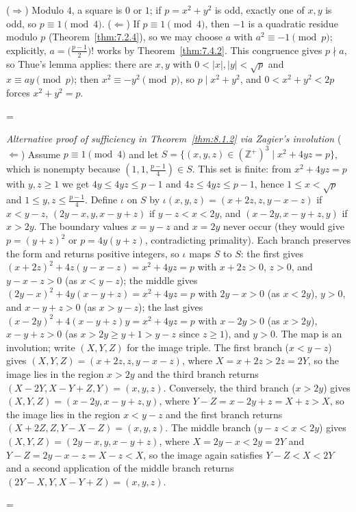 \documentclass[11pt]{article}
\makeatletter
\theoremstyle{ntstyle}
\let\nt@closedisplay\]
\def\nt@guardedclose{\@ifnextchar\par{\nt@closeafterpar}{\@ifnextchar\end{\postdisplaypenalty\@M\nt@closedisplay}{\nt@closedisplay}}}
\def\nt@closeafterpar\par{\@ifnextchar\par{\nt@closeafterpar}{\@ifnextchar\end{\postdisplaypenalty\@M\nt@closedisplay\par}{\nt@closedisplay\par}}}
\renewenvironment{proof}[1][\proofname]{\par
  \pushQED{\qed}\normalfont\topsep\medskipamount\edef\nt@afterproof{\@endparpenalty=\the\@endparpenalty\relax}\@beginparpenalty\@M\@endparpenalty\@M\let\]\nt@guardedclose\trivlist\item[]\textit{#1\@addpunct{.}} \ignorespaces}{\ifvmode\addpenalty\@M\fi\popQED\nt@afterproof\endtrivlist\@endpefalse}
\newenvironment{altproof}[1][\proofname]{\begin{proof}[#1]\renewcommand{\qedsymbol}{}}{\end{proof}}
\makeatother
\begin{document}
\begin{proof} ($\Rightarrow$) Modulo $4$, a square is $0$
	or $1$; if $p = x^2 + y^2$ is odd, exactly one of $x, y$ is odd, so
	$p \equiv 1 \pmod{4}$. ($\Leftarrow$) If $p \equiv 1 \pmod{4}$, then
	$-1$ is a quadratic residue modulo $p$ (Theorem~\ref{thm:7.2.4}), so we may choose $a$ with $a^2
		\equiv -1 \pmod{p}$; explicitly, $a=\big(\tfrac{p-1}{2}\big)!$ works by
	Theorem~\ref{thm:7.4.2}. This congruence gives $p\nmid a$, so Thue's
	lemma applies: there are $x, y$ with $0 < |x|,
		|y| < \sqrt{p}$ and $x \equiv a y \pmod{p}$; then $x^2 \equiv -y^2
		\pmod{p}$, so $p \mid x^2 + y^2$, and $0 < x^2 + y^2 < 2p$ forces $x^2
		+ y^2 = p$.

\end{proof}
\begin{altproof}[Alternative proof of sufficiency in Theorem~\ref{thm:8.1.2} via Zagier's involution] ($\Leftarrow$) Assume $p \equiv 1
		\pmod{4}$ and let $S = \{(x, y, z) \in (\mathbb{Z}^+)^3 \mid x^2 + 4yz =
		p\}$, which is nonempty because $(1, 1, \tfrac{p-1}{4}) \in S$. This set is finite:
	from $x^2+4yz=p$ with $y,z\ge1$ we get $4y\le 4yz\le p-1$ and
	$4z\le 4yz\le p-1$, hence $1\le x<\sqrt{p}$ and $1\le y,z\le\tfrac{p-1}{4}$. Define
	$\iota$ on $S$
	by $\iota(x, y, z) = (x + 2z, z, y - x - z)$ if $x < y - z$, $(2y -
		x, y, x - y + z)$ if $y - z < x < 2y$, and $(x - 2y, x - y + z, y)$ if $x
		> 2y$. The boundary values $x = y - z$ and $x = 2y$ never occur (they
	would give $p = (y+z)^2$ or $p = 4y(y+z)$, contradicting primality).
	Each branch preserves the form and returns positive integers, so
	$\iota$ maps $S$ to $S$: the first gives
	$(x+2z)^2+4z(y-x-z)=x^2+4yz=p$ with $x+2z>0$, $z>0$, and $y-x-z>0$
	(as $x<y-z$); the middle gives $(2y-x)^2+4y(x-y+z)=x^2+4yz=p$ with
	$2y-x>0$ (as $x<2y$), $y>0$, and $x-y+z>0$ (as $x>y-z$); the last
	gives $(x-2y)^2+4(x-y+z)y=x^2+4yz=p$ with $x-2y>0$ (as $x>2y$),
	$x-y+z>0$ (as $x>2y\ge y+1>y-z$ since $z\ge1$), and $y>0$.
	  The map is an involution; write $(X,Y,Z)$ for the image triple.
	  The first branch ($x<y-z$) gives $(X,Y,Z)=(x+2z,z,y-x-z)$, where $X=x+2z>2z=2Y$, so the image lies in the region $x>2y$ and the third branch returns $(X-2Y,X-Y+Z,Y)=(x,y,z)$.
	  Conversely, the third branch ($x>2y$) gives $(X,Y,Z)=(x-2y,x-y+z,y)$, where $Y-Z=x-2y+z=X+z>X$, so the image lies in the region $x<y-z$ and the first branch returns $(X+2Z,Z,Y-X-Z)=(x,y,z)$.
	  The middle branch ($y-z<x<2y$) gives $(X,Y,Z)=(2y-x,y,x-y+z)$, where $X=2y-x<2y=2Y$ and $Y-Z=2y-x-z=X-z<X$, so the image again satisfies $Y-Z<X<2Y$ and a second application of the middle branch returns $(2Y-X,Y,X-Y+Z)=(x,y,z)$.

\end{altproof}
\end{document}
